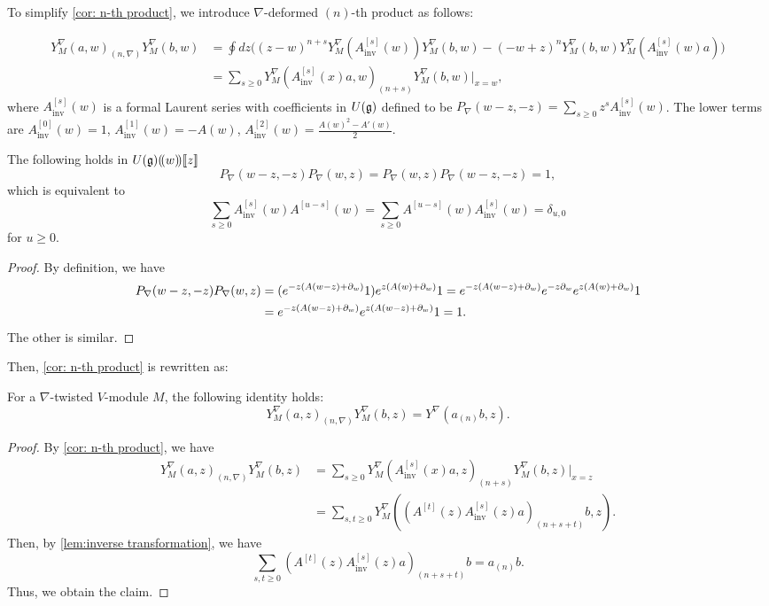 \documentclass[final,reqno]{amsart}
\begin{document}
To simplify \cref{cor: n-th product}, we introduce $\nabla$-deformed $(n)$-th product as follows:
\begin{dfn}\label{dfn:deformed n-th product of tw mods}
\[
    \begin{split}
    Y^\nabla_M(a,w)_{(n,\nabla)}Y^\nabla_M(b,w)
    &=\oint dz \bigl((z-w)^{n+s}Y^\nabla_M(A^{[s]}_\mathrm{inv}(w))Y^\nabla_M(b,w)-(-w+z)^nY^\nabla_M(b,w)Y^\nabla_M(A^{[s]}_\mathrm{inv}(w)a)\bigr)\\
    &=\sum_{s\geq 0}Y^\nabla_M(A^{[s]}_\mathrm{inv}(x)a,w)_{(n+s)}Y^\nabla_M(b,w)|_{x=w},
    \end{split}
\]
where $A^{[s]}_\mathrm{inv}(w)$ is a formal Laurent series with coefficients in $U(\mathfrak{g})$ defined to be $P_\nabla(w-z,-z)=\sum_{s\geq 0}z^sA^{[s]}_\mathrm{inv}(w)$. The lower terms are $A^{[0]}_\mathrm{inv}(w)=1$, $A^{[1]}_\mathrm{inv}(w)=-A(w)$, $A^{[2]}_\mathrm{inv}(w)=\frac{A(w)^2-A'(w)}{2}$.
\end{dfn}

\begin{lem}\label{lem:inverse transformation}
    The following holds in $U(\mathfrak{g})(\!( w )\!)\llbracket z \rrbracket$
    \[
        P_\nabla(w-z,-z)P_\nabla(w,z)=P_\nabla(w,z)P_\nabla(w-z,-z)=1,
    \]
    which is equivalent to
    \[
        \sum_{s\geq 0}A^{[s]}_\mathrm{inv}(w)A^{[u-s]}(w)=\sum_{s\geq 0}A^{[u-s]}(w)A^{[s]}_\mathrm{inv}(w)=\delta_{u,0}
    \]
    for $u\geq 0$.
\end{lem}

\begin{proof}
    By definition, we have
    \[
        \begin{split}
        P_\nabla(w-z,-z)P_\nabla(w,z)
        &=(e^{-z(A(w-z)+\partial_w)}1)e^{z(A(w)+\partial_w)}1
        =e^{-z(A(w-z)+\partial_w)}e^{-z\partial_w}e^{z(A(w)+\partial_w)}1\\
        &=e^{-z(A(w-z)+\partial_w)}e^{z(A(w-z)+\partial_w)}1=1.
        \end{split}
    \]
    The other is similar.
\end{proof}

Then, \cref{cor: n-th product} is rewritten as:
\begin{cor}\label{cor:deformed n-th product identity}
    For a $\nabla$-twisted $V$-module $M$, the following identity holds:
    \[
        Y^\nabla_M(a,z)_{(n,\nabla)}Y^\nabla_M(b,z)=Y^\nabla(a_{(n)}b,z).
    \]
\end{cor}



\begin{proof}
    By \cref{cor: n-th product}, we have
    \[
        \begin{split}
        Y^\nabla_M(a,z)_{(n,\nabla)}Y^\nabla_M(b,z)
        &=\sum_{s\geq 0}Y^\nabla_M(A^{[s]}_\mathrm{inv}(x)a,z)_{(n+s)}Y^\nabla_M(b,z)|_{x=z}\\
        &=\sum_{s,t\geq 0}Y^\nabla_M((A^{[t]}(z)A^{[s]}_\mathrm{inv}(z)a)_{(n+s+t)}b,z).
        \end{split}
    \]
    Then, by \cref{lem:inverse transformation}, we have
    \[
        \sum_{s,t\geq 0}(A^{[t]}(z)A^{[s]}_\mathrm{inv}(z)a)_{(n+s+t)}b=a_{(n)}b.
    \]
    Thus, we obtain the claim.
\end{proof}
\end{document}
